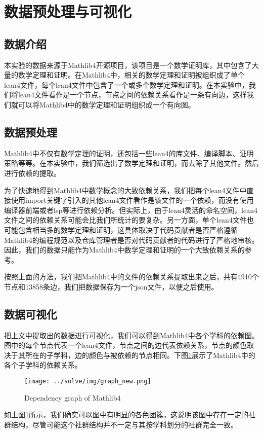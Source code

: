 \section{数据预处理与可视化}

\subsection{数据介绍}

本实验的数据来源于Mathlib4开源项目\cite{mathlib4}，该项目是一个数学证明库，其中包含了大量的数学定理和证明。在Mathlib4中，相关的数学定理和证明被组织成了单个lean4文件，每个lean4文件中包含了一个或多个数学定理和证明。在本实验中，我们将lean4文件看作是一个节点，节点之间的依赖关系看作是一条有向边，这样我们就可以将Mathlib4中的数学定理和证明组织成一个有向图。

\subsection{数据预处理}

Mathlib4中不仅有数学定理的证明，还包括一些lean4的库文件、编译脚本、证明策略等等。在本实验中，我们筛选出了数学定理和证明，而去除了其他文件。然后进行依赖的提取。

为了快速地得到Mathlib4中数学概念的大致依赖关系，我们把每个lean4文件中直接使用import关键字引入的其他lean4文件看作是该文件的一个依赖，而没有使用编译器前端或者lsp等进行依赖分析。但实际上，由于lean4灵活的命名空间，lean4文件之间的依赖关系可能会比我们所统计的要复杂。另一方面，单个lean4文件也可能包含相当多的数学定理和证明，这具体取决于代码贡献者是否严格遵循Mathlib4的编程规范以及仓库管理者是否对代码贡献者的代码进行了严格地审核。因此，我们的数据只能作为Mathlib4中数学定理和证明的一个大致依赖关系的参考。

按照上面的方法，我们把Mathlib4中的文件的依赖关系提取出来之后，共有4910个节点和13858条边，我们把数据保存为一个json文件，以便之后使用。

\subsection{数据可视化}

把上文中提取出的数据进行可视化，我们可以得到Mathlib4中各个学科的依赖图。图中的每个节点代表一个lean4文件，节点之间的边代表依赖关系，节点的颜色取决于其所在的子学科，边的颜色与被依赖的节点相同。下图\ref{fig:dependency}展示了Mathlib4中的各个子学科的依赖关系。

\begin{figure}[h!]
    \centering
    \texttt{[image: ../solve/img/graph\_new.png]}
    \caption{Dependency graph of Mathlib4}
    \label{fig:dependency}
\end{figure}

如上图\ref{fig:dependency}所示，我们确实可以图中有明显的各色团簇，这说明该图中存在一定的社群结构，尽管可能这个社群结构并不一定与其按学科划分的社群完全一致。
